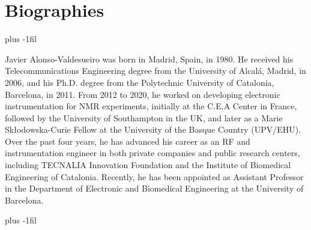 \documentclass[lettersize,journal]{IEEEtran}
\begin{document}
 
%
%







\section{Biographies}
\baselineskip plus -1fil
\begin{IEEEbiography}{Javier Alonso-Valdesueiro} was born in Madrid, Spain, in 1980. He received his Telecommunications Engineering degree from the University of Alcalá, Madrid, in 2006, and his Ph.D. degree from the Polytechnic University of Catalonia, Barcelona, in 2011. From 2012 to 2020, he worked on developing electronic instrumentation for NMR experiments, initially at the C.E.A Center in France, followed by the University of Southampton in the UK, and later as a Marie Skłodowska-Curie Fellow at the University of the Basque Country (UPV/EHU). Over the past four years, he has advanced his career as an RF and instrumentation engineer in both private companies and public research centers, including TECNALIA Innovation Foundation and the Institute of Biomedical Engineering of Catalonia. Recently, he has been appointed as Assistant Professor in the Department of Electronic and Biomedical Engineering at the University of Barcelona.
\end{IEEEbiography}
\baselineskip plus -1fil
\vfill
\end{document}
